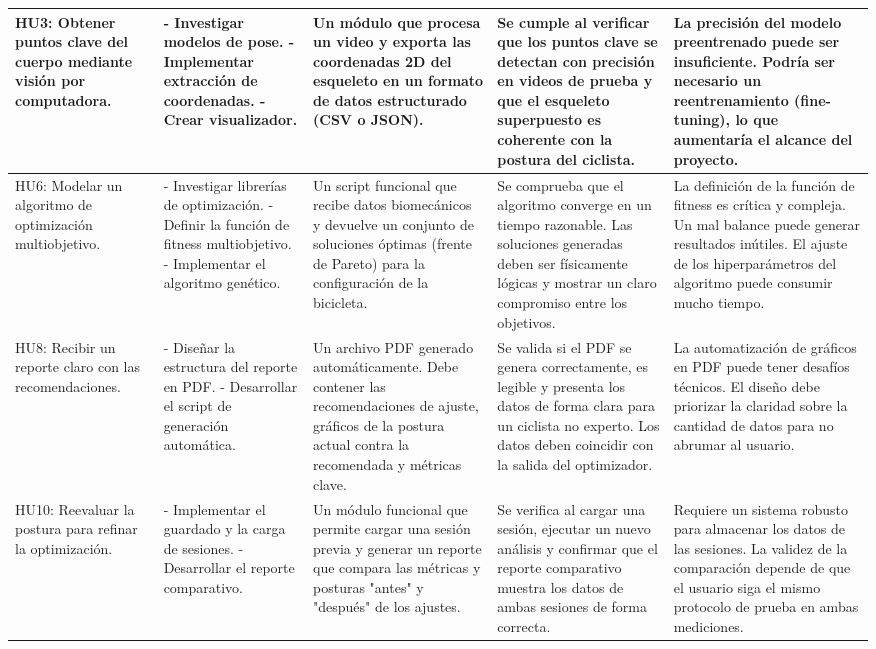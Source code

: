 \documentclass[
11pt, %
]{charter}
\begin{document}
\begin{xltabular}{\linewidth}{| X | X | X | X | X |}
HU3: Obtener puntos clave del cuerpo mediante visión por computadora.
 & - Investigar modelos de pose. \newline - Implementar extracción de coordenadas. \newline - Crear visualizador.
 & Un módulo que procesa un video y exporta las coordenadas 2D del esqueleto en un formato de datos estructurado (CSV o JSON).
 & Se cumple al verificar que los puntos clave se detectan con precisión en videos de prueba y que el esqueleto superpuesto es coherente con la postura del ciclista.
 & La precisión del modelo preentrenado puede ser insuficiente. Podría ser necesario un reentrenamiento (fine-tuning), lo que aumentaría el alcance del proyecto. \\
\hline
HU6: Modelar un algoritmo de optimización multiobjetivo.
 & - Investigar librerías de optimización. \newline - Definir la función de fitness multiobjetivo. \newline - Implementar el algoritmo genético.
 & Un script funcional que recibe datos biomecánicos y devuelve un conjunto de soluciones óptimas (frente de Pareto) para la configuración de la bicicleta.
 & Se comprueba que el algoritmo converge en un tiempo razonable. Las soluciones generadas deben ser físicamente lógicas y mostrar un claro compromiso entre los objetivos.
 & La definición de la función de fitness es crítica y compleja. Un mal balance puede generar resultados inútiles. El ajuste de los hiperparámetros del algoritmo puede consumir mucho tiempo. \\
\hline
HU8: Recibir un reporte claro con las recomendaciones.
 & - Diseñar la estructura del reporte en PDF. \newline - Desarrollar el script de generación automática.
 & Un archivo PDF generado automáticamente. Debe contener las recomendaciones de ajuste, gráficos de la postura actual contra la recomendada y métricas clave.
 & Se valida si el PDF se genera correctamente, es legible y presenta los datos de forma clara para un ciclista no experto. Los datos deben coincidir con la salida del optimizador.
 & La automatización de gráficos en PDF puede tener desafíos técnicos. El diseño debe priorizar la claridad sobre la cantidad de datos para no abrumar al usuario. \\
\hline
HU10: Reevaluar la postura para refinar la optimización.
 & - Implementar el guardado y la carga de sesiones. \newline - Desarrollar el reporte comparativo.
 & Un módulo funcional que permite cargar una sesión previa y generar un reporte que compara las métricas y posturas "antes" y "después" de los ajustes.
 & Se verifica al cargar una sesión, ejecutar un nuevo análisis y confirmar que el reporte comparativo muestra los datos de ambas sesiones de forma correcta.
 & Requiere un sistema robusto para almacenar los datos de las sesiones. La validez de la comparación depende de que el usuario siga el mismo protocolo de prueba en ambas mediciones. \\

\end{xltabular}
\end{document}
